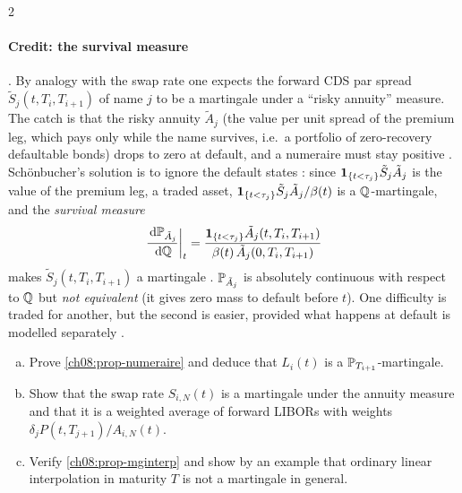 \begin{paracol}{2}
\paragraph{Credit: the survival measure} . By analogy with the swap rate one expects the forward
CDS par spread $\tilde S_j(t,T_i,T_{i+1})$ of name $j$ to be a martingale under a ``risky annuity'' measure. The
catch is that the risky annuity $\tilde A_j$ (the value per unit spread of the premium leg, which pays only while
the name survives, i.e.\ a portfolio of zero-recovery defaultable bonds) drops to zero at default, and a numeraire
must stay positive . Sch\"onbucher's solution is to ignore the default states
: since $\mathbf{1}_{\{t<\tau_j\}}\tilde S_j\tilde A_j$ is the value of the premium leg, a traded asset,
$\mathbf{1}_{\{t<\tau_j\}}\tilde S_j\tilde A_j/\beta(t)$ is a $\mathbb{Q}$-martingale, and the \emph{survival measure}
\[
  \left.\frac{\,\mathrm{d}\mathbb{P}_{\tilde A_j}}{\,\mathrm{d}\mathbb{Q}}\right|_{t}=\frac{\mathbf{1}_{\{t<\tau_j\}}\tilde A_j(t,T_i,T_{i+1})}{\beta(t)\,\tilde A_j(0,T_i,T_{i+1})}
\]
makes $\tilde S_j(t,T_i,T_{i+1})$ a martingale . $\mathbb{P}_{\tilde A_j}$ is absolutely continuous
with respect to $\mathbb{Q}$ but \emph{not equivalent} (it gives zero mass to default before $t$). One difficulty is traded
for another, but the second is easier, provided what happens at default is modelled separately
.

\begin{exercise}
\leavevmode
\begin{enumerate}[(a)]
  \item Prove \cref{ch08:prop-numeraire} and deduce that $L_i(t)$ is a $\mathbb{P}_{T_{i+1}}$-martingale.
  \item Show that the swap
      rate $S_{i,N}(t)$ is a martingale under the annuity measure and that it is a weighted average of forward LIBORs with
      weights $\delta_jP(t,T_{j+1})/A_{i,N}(t)$.
  \item Verify \cref{ch08:prop-mginterp} and show by an example that ordinary
      linear interpolation in maturity $T$ is not a martingale in general.
\end{enumerate}
\end{exercise}


\end{paracol}
